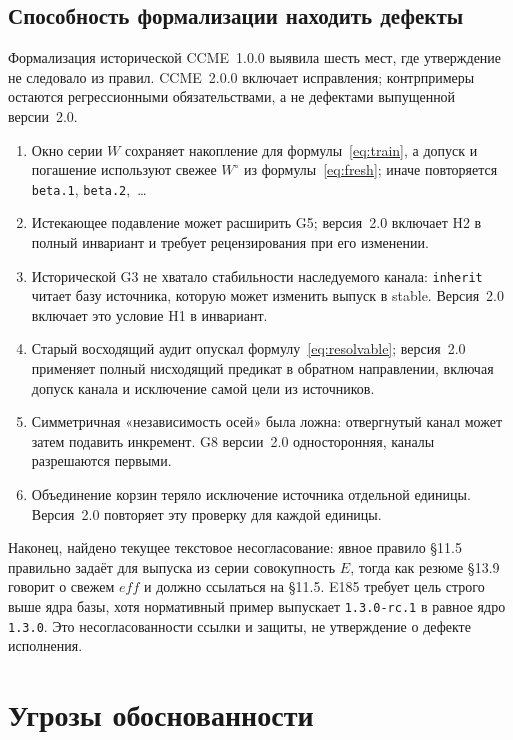 \documentclass[sigconf,nonacm]{acmart}
\theoremstyle{acmplain}
\theoremstyle{acmdefinition}
\theoremstyle{acmplain}
\newcommand{\code}[1]{\texttt{#1}}
\newcommand{\G}[1]{G#1}
\begin{document}
\subsection{Способность формализации находить дефекты}
\label{sec:eval:formal}

Формализация исторической CCME~1.0.0 выявила шесть мест, где утверждение не
следовало из правил. CCME~2.0.0 включает исправления; контрпримеры остаются
регрессионными обязательствами, а не дефектами выпущенной версии~2.0.
\begin{enumerate}
\item Окно серии $W$ сохраняет накопление для формулы~\ref{eq:train}, а допуск
и погашение используют свежее $W^\circ$ из формулы~\ref{eq:fresh}; иначе
повторяется \code{beta.1}, \code{beta.2},~\ldots
\item Истекающее подавление может расширить \G{5}; версия~2.0 включает H2 в
полный инвариант и требует рецензирования при его изменении.
\item Исторической \G{3} не хватало стабильности наследуемого канала:
\code{inherit} читает базу источника, которую может изменить выпуск в stable.
Версия~2.0 включает это условие H1 в инвариант.
\item Старый восходящий аудит опускал формулу~\ref{eq:resolvable}; версия~2.0
применяет полный нисходящий предикат в обратном направлении, включая допуск
канала и исключение самой цели из источников.
\item Симметричная «независимость осей» была ложна: отвергнутый канал может
затем подавить инкремент. \G{8} версии~2.0 односторонняя, каналы разрешаются
первыми.
\item Объединение корзин теряло исключение источника отдельной единицы.
Версия~2.0 повторяет эту проверку для каждой единицы.
\end{enumerate}

Наконец, найдено текущее текстовое несогласование: явное правило \S11.5
правильно задаёт для выпуска из серии совокупность $E$, тогда как резюме
\S13.9 говорит о свежем $\mathit{eff}$ и должно ссылаться на \S11.5. E185
требует цель строго выше ядра базы, хотя нормативный пример выпускает
\code{1.3.0-rc.1} в равное ядро \code{1.3.0}. Это несогласованности ссылки и
защиты, не утверждение о дефекте исполнения.
\section{Угрозы обоснованности}
\label{sec:threats}
\end{document}
